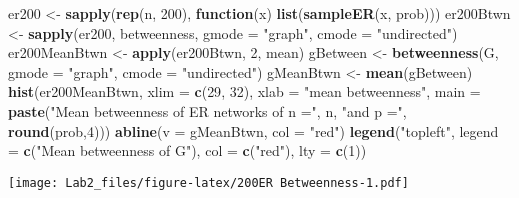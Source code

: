 \documentclass[]{article}
\newenvironment{Shaded}{\begin{snugshade}}{\end{snugshade}}
\newcommand{\KeywordTok}[1]{\textcolor[rgb]{0.13,0.29,0.53}{\textbf{#1}}}
\newcommand{\DataTypeTok}[1]{\textcolor[rgb]{0.13,0.29,0.53}{#1}}
\newcommand{\DecValTok}[1]{\textcolor[rgb]{0.00,0.00,0.81}{#1}}
\newcommand{\StringTok}[1]{\textcolor[rgb]{0.31,0.60,0.02}{#1}}
\newcommand{\ControlFlowTok}[1]{\textcolor[rgb]{0.13,0.29,0.53}{\textbf{#1}}}
\newcommand{\NormalTok}[1]{#1}
\begin{document}
\begin{Shaded}
\begin{Highlighting}[]
\NormalTok{er200 <-}\StringTok{ }\KeywordTok{sapply}\NormalTok{(}\KeywordTok{rep}\NormalTok{(n, }\DecValTok{200}\NormalTok{), }\ControlFlowTok{function}\NormalTok{(x) }\KeywordTok{list}\NormalTok{(}\KeywordTok{sampleER}\NormalTok{(x, prob)))}
\NormalTok{er200Btwn <-}\StringTok{ }\KeywordTok{sapply}\NormalTok{(er200, betweenness, }\DataTypeTok{gmode =} \StringTok{"graph"}\NormalTok{, }\DataTypeTok{cmode =} \StringTok{"undirected"}\NormalTok{)}
\NormalTok{er200MeanBtwn <-}\StringTok{ }\KeywordTok{apply}\NormalTok{(er200Btwn, }\DecValTok{2}\NormalTok{, mean)}
\NormalTok{gBetween <-}\StringTok{ }\KeywordTok{betweenness}\NormalTok{(G, }\DataTypeTok{gmode =} \StringTok{"graph"}\NormalTok{, }\DataTypeTok{cmode =} \StringTok{"undirected"}\NormalTok{)}
\NormalTok{gMeanBtwn <-}\StringTok{ }\KeywordTok{mean}\NormalTok{(gBetween)}
\KeywordTok{hist}\NormalTok{(er200MeanBtwn, }\DataTypeTok{xlim =} \KeywordTok{c}\NormalTok{(}\DecValTok{29}\NormalTok{, }\DecValTok{32}\NormalTok{), }\DataTypeTok{xlab =} \StringTok{"mean betweenness"}\NormalTok{,}
     \DataTypeTok{main =} \KeywordTok{paste}\NormalTok{(}\StringTok{"Mean betweenness of ER networks of n ="}\NormalTok{, n, }\StringTok{"and p ="}\NormalTok{, }\KeywordTok{round}\NormalTok{(prob,}\DecValTok{4}\NormalTok{)))}
\KeywordTok{abline}\NormalTok{(}\DataTypeTok{v =}\NormalTok{ gMeanBtwn, }\DataTypeTok{col =} \StringTok{"red"}\NormalTok{)}
\KeywordTok{legend}\NormalTok{(}\StringTok{"topleft"}\NormalTok{, }\DataTypeTok{legend =} \KeywordTok{c}\NormalTok{(}\StringTok{"Mean betweenness of G"}\NormalTok{), }\DataTypeTok{col =} \KeywordTok{c}\NormalTok{(}\StringTok{"red"}\NormalTok{), }\DataTypeTok{lty =} \KeywordTok{c}\NormalTok{(}\DecValTok{1}\NormalTok{))}
\end{Highlighting}
\end{Shaded}

\texttt{[image: Lab2\_files/figure-latex/200ER Betweenness-1.pdf]}
\end{document}
